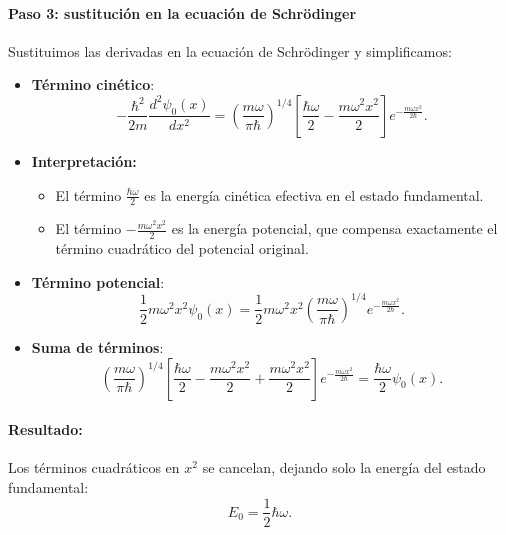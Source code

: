 \documentclass[12pt, a4paper]{article}
\theoremstyle{rioplatense}
\begin{document}
\paragraph{Paso 3: sustitución en la ecuación de Schrödinger}
Sustituimos las derivadas en la ecuación de Schrödinger y simplificamos:
\begin{itemize}
    \item \textbf{Término cinético}:
    \begin{equation*}
        -\frac{\hbar^2}{2m} \frac{d^2\psi_0(x)}{dx^2} = \left( \frac{m\omega}{\pi\hbar} \right)^{1/4} \left[ \frac{\hbar\omega}{2} - \frac{m\omega^2 x^2}{2} \right] e^{-\frac{m\omega x^2}{2\hbar}}.
    \end{equation*}

    \item \textbf{Interpretación:}
    \begin{itemize}
        \item El término \(\frac{\hbar\omega}{2}\) es la energía cinética efectiva en el estado fundamental.
        \item El término \(-\frac{m\omega^2 x^2}{2}\) es la energía potencial, que compensa exactamente el término cuadrático del potencial original.
    \end{itemize}

    \item \textbf{Término potencial}:
    \begin{equation*}
        \frac{1}{2}m\omega^2x^2\psi_0(x) = \frac{1}{2}m\omega^2x^2 \left( \frac{m\omega}{\pi\hbar} \right)^{1/4} e^{-\frac{m\omega x^2}{2\hbar}}.
    \end{equation*}

    \item \textbf{Suma de términos}:
    \begin{equation*}
        \left( \frac{m\omega}{\pi\hbar} \right)^{1/4} \left[ \frac{\hbar\omega}{2} - \frac{m\omega^2 x^2}{2} + \frac{m\omega^2 x^2}{2} \right] e^{-\frac{m\omega x^2}{2\hbar}} = \frac{\hbar\omega}{2} \psi_0(x).
    \end{equation*}
\end{itemize}

\paragraph{Resultado:}
Los términos cuadráticos en \(x^2\) se cancelan, dejando solo la energía del estado fundamental:
\begin{equation*}
    E_0 = \frac{1}{2}\hbar\omega.
\end{equation*}
\end{document}
